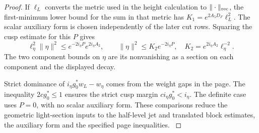 \begin{proof}
If \(\ell_L\) converts the metric used in the height
calculation to \(\|\cdot\|_{\rm rec}\), the first-minimum
lower bound for the sum in that metric has
\(K_1=e^{2A_5D_F}\ell_L^2\). The scalar auxiliary form
is chosen independently of the later cut rows. Squaring the cusp estimate for this \(P\) gives
\[
 \ell_\eta^2\|\eta\|^2\le e^{-2i_\eta P}e^{2i_\eta A_2},
 \qquad
 \|\eta\|^2\le K_2e^{-2i_\eta P},\quad
 K_2=e^{2i_\eta A_2}\ell_\eta^{-2}.
\]
The two component bounds on \(\eta\) are its nonvanishing
as a section on each component and the displayed decay.

Strict dominance of \(i_\eta g_0^*w_L-w_\eta\)
comes from the weight gaps in the page. The inequality
\(2cg_0^*\le1\) ensures the strict cusp margin
\(c i_\eta g_0^*<i_\eta\).
The definite case uses \(P=0\), with no scalar auxiliary
form. These comparisons reduce the geometric light-section
inputs to the half-level jet and translated block estimates,
the auxiliary form and the specified page inequalities.
\label{cor:slice-light-3}
\end{proof}

